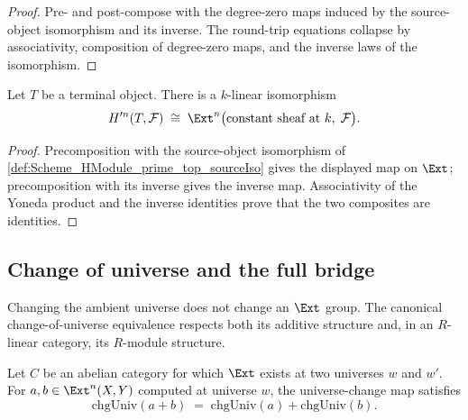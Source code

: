 \begin{proof}


\leanok
  Pre- and post-compose with the degree-zero maps induced by the source-object isomorphism and its inverse. The round-trip equations collapse by associativity, composition of degree-zero maps, and the inverse laws of the isomorphism.
\end{proof}

\begin{definition}\leanok
  \label{def:Scheme_HModule_prime_top_linearEquiv}

  Let \(T\) be a terminal object. There is a \(k\)-linear isomorphism
  \[
    H^{\prime n}(T, \mathcal F) \;\cong\; \Ext^{n}\bigl(\text{constant sheaf at }k,\; \mathcal F\bigr).
  \]
\end{definition}

\begin{proof}


\leanok
  Precomposition with the source-object isomorphism of \cref{def:Scheme_HModule_prime_top_sourceIso} gives the displayed map on \(\Ext\); precomposition with its inverse gives the inverse map. Associativity of the Yoneda product and the inverse identities prove that the two composites are identities.
\end{proof}

\subsection{Change of universe and the full bridge}

Changing the ambient universe does not change an \(\Ext\) group. The canonical change-of-universe equivalence respects both its additive structure and, in an \(R\)-linear category, its \(R\)-module structure.

\begin{lemma}\leanok
  \label{lem:Abelian_Ext_chgUniv_add}
  Let \(C\) be an abelian category for which \(\Ext\) exists at two universes \(w\) and \(w'\). For \(a, b \in \Ext^{n}(X, Y)\) computed at universe \(w\), the universe-change map satisfies
  \[
    \mathrm{chgUniv}(a + b) \;=\; \mathrm{chgUniv}(a) + \mathrm{chgUniv}(b).
  \]
\end{lemma}

